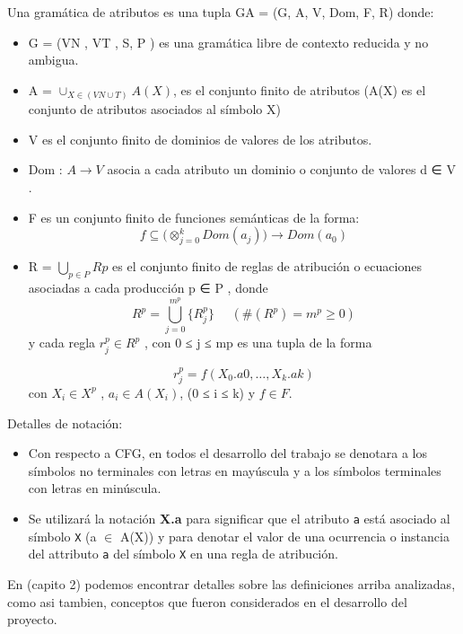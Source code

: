 \begin{definition}
\label{def:grammarattr}
Una gramática de atributos es una tupla GA = (G, A, V, Dom, F, R) donde:
\begin{itemize}
\item G = (VN , VT , S, P ) es una gramática libre de contexto reducida y no ambigua.
\item A = $\cup_{X\in(VN \cup T)} A(X)$, es el conjunto finito de atributos (A(X) es el conjunto de atributos asociados al símbolo X)

\item V es el conjunto finito de dominios de valores de los atributos.
\item Dom : $A\rightarrow V$ asocia a cada atributo un dominio o conjunto de valores d ∈ V .
\item F es un conjunto finito de funciones semánticas de la forma:
\begin{equation}
f \subseteq (\otimes_{j=0}^{k}{ Dom(a_{j} ))\rightarrow Dom(a_{0})}
\end{equation}

\item R = $\bigcup _{p∈P} Rp$ es el conjunto finito de reglas de atribución o ecuaciones asociadas a cada producción p ∈ P , donde
\begin{equation}
R^{p} = \bigcup\limits_{j=0}^{m^{p}}{\{R_{j}^{p}\}}\ \ \ \ \ \ (\#(R^{p} ) = m^{p} ≥ 0)
\end{equation}
y cada regla $r_{j}^{p} \in R^{p}$ , con 0 ≤ j ≤ mp es una tupla de la forma

\begin{equation}
r_{j}^{p} = f(X_{0}.a0 ,\dots , X_{k}.ak)
\end{equation} 
con $X_{i} \in X^{p}$ , $a_{i} \in A(X_{i})$, (0 ≤ i ≤ k) y $f \in F$.

\end{itemize}
\end{definition}

Detalles de notación:
\begin{itemize}
\item Con respecto a CFG, en todos el desarrollo del trabajo se denotara a los símbolos no terminales con letras en mayúscula y a los símbolos terminales con letras en minúscula.
\item Se utilizará la notación \textbf{X.a} para significar que el atributo \texttt{a} está asociado al símbolo \texttt{X} (a $\in$ A(X)) y para denotar el valor de una ocurrencia o instancia del attributo \texttt{a} del símbolo \texttt{X} en una regla de atribución.

\end{itemize}
En \cite{tesismarcelo} (capito 2) podemos encontrar detalles sobre las definiciones arriba analizadas, como asi tambien, conceptos que fueron considerados en el desarrollo del proyecto.  

